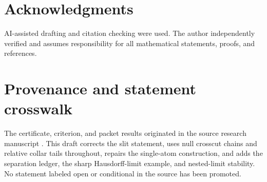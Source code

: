\documentclass[11pt,reqno]{amsart}
\theoremstyle{definition}
\theoremstyle{remark}
\begin{document}
\section*{Acknowledgments}
AI-assisted drafting and citation checking were used.  The author
independently verified and assumes responsibility for all mathematical
statements, proofs, and references.

\appendix

\section{Provenance and statement crosswalk}\label{sec:crosswalk}

The certificate, criterion, and packet results originated in the source
research manuscript \cite{MWman}.  This draft corrects the slit statement,
uses null crosscut chains and relative collar tails throughout, repairs the
single-atom construction, and adds the separation ledger, the sharp
Hausdorff-limit example, and nested-limit stability.  No statement labeled
open or conditional in the source has been promoted.
\end{document}
